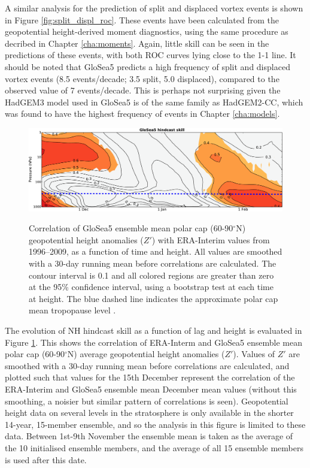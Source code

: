A similar analysis for the prediction of split and displaced vortex events is
shown in Figure \ref{fig:split_displ_roc}. These events have been calculated
from the geopotential height-derived moment diagnostics, using the same
procedure as decribed in Chapter \ref{cha:moments}. Again, little skill can be
seen in the predictions of these events, with both ROC curves lying close to the
1-1 line. It should be noted that GloSea5 predicts a high frequency of split and
displaced vortex events (8.5 events/decade; 3.5 split, 5.0 displaced), compared
to the observed value of 7 events/decade. This is perhaps not surprising given
the HadGEM3 model used in GloSea5 is of the same family as HadGEM2-CC, which was
found to have the highest frequency of events in Chapter \ref{cha:models}.

\begin{figure}[t] \centering
  \noindent\includegraphics[width=\textwidth,angle=0]{figures/chapter-seasonal/NH_lag_height_corr.pdf}\\
  \caption[Lag-height correlation of NH polar cap geopotential
  height.]{Correlation of GloSea5 ensemble mean polar cap (60-90$^{\circ}$N)
    geopotential height anomalies ($Z'$) with ERA-Interim values from
    1996--2009, as a function of time and height. All values are smoothed with a
    30-day running mean before correlations are calculated. The contour interval
    is 0.1 and all colored regions are greater than zero at the 95\% confidence
    interval, using a bootstrap test at each time at height. The blue dashed
    line indicates the approximate polar cap mean tropopause level
    \citep{Wilcox2012}.}\label{fig:nh_pc_gph_corr}
\end{figure}

\bigskip The evolution of NH hindcast skill as a function of lag and height is
evaluated in Figure \ref{fig:nh_pc_gph_corr}. This shows the correlation of
ERA-Interm and GloSea5 ensemble mean polar cap (60-90$^\circ$N) average
geopotential height anomalies ($Z'$). Values of $Z'$ are smoothed with a 30-day
running mean before correlations are calculated, and plotted such that values
for the 15th December represent the correlation of the ERA-Interim and GloSea5
ensemble mean December mean values (without this smoothing, a noisier but
similar pattern of correlations is seen). Geopotential height data on several
levels in the stratosphere is only available in the shorter 14-year, 15-member
ensemble, and so the analysis in this figure is limited to these data. Between
1st-9th November the ensemble mean is taken as the average of the 10 initialised
ensemble members, and the average of all 15 ensemble members is used after this
date.

